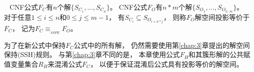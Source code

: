 
\begin{definition}\label{4:SSPEdefinition}~
CNF公式$F_C$有$n$个解$\{S_{C_1},...,S_{C_n}\}$。
CNF公式$F_O$有$n * m$个解$\{S_{O_1},...,S_{O_{n \cdot m}}\}$。
对于任意$1\le i\le n$和$0\le j\le m-1$，
有$S_{C_i} \subseteq S_{O_{i + {n * j}}}$，
则称$F_O$解空间投影等价于$F_C$，
记为$F_C \equiv_{_{SSPE}} F_O$。
\end{definition}

为了在新公式中保持$F_C$公式中的所有解，
仍然需要使用第\ref{chap:3}章提出的解空间保持(SSH)规则。
与第\ref{chap:3}章不同的是，
本章使用公式$F_H$和其簇形解的公共赋值变量集合$R_H$来混淆公式$F_C$，
以便于保证混淆后公式具有投影等价的解空间。

%

